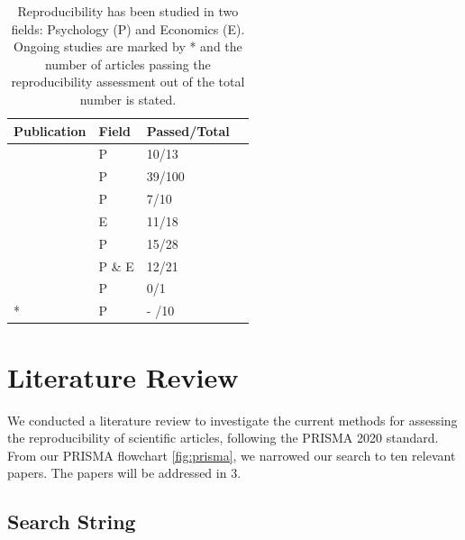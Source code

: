 \documentclass[12pt, a4paper, twocolumn]{article}
\begin{document}
		\begin{table}[htbp]
		\centering
		\caption[Reproducibility Projects]{Reproducibility has been studied in two fields: Psychology (P) and Economics (E). Ongoing studies are marked by * and the number of articles passing the reproducibility assessment out of the total number is stated.}\label{tab:reproducibility_studies_table}
		\small
		\begin{tabular}{p{2.5cm}lll}
		\hline
		Publication                                         &    Field        &  Passed/Total  \\ \hline
		\citet{Klein2014data}                          &  P            &       10/13       \\		
		\citet{Open2015estimating}                 &  P            &       39/100     \\
		\citet{Ebersole2016many}                    &  P            &       7/10        \\
		\citet{Camerer2016evaluating}             &  E            &       11/18       \\ 
		\citet{Klein2018many}                         &  P            &       15/28       \\ 
		\citet{Camerer2018evaluating}             & P \& E      &       12/21       \\
		\citet{Klein2019Failure}                       & P             &         0/1         \\
		\citet{manylabs5}*                             & P             &    - /10  \\ \hline 
		\end{tabular}
		\end{table}


	\section{Literature Review}
	
	We conducted a literature review to investigate the current methods for assessing the reproducibility of scientific articles, following the PRISMA 2020 standard. From our PRISMA flowchart \ref{fig:prisma}, we narrowed our search to ten relevant papers. The papers will be addressed in 3.

	\subsection{Search String}
\end{document}
